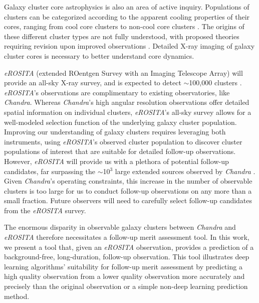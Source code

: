 \documentclass[twocolumn, 11pt]{aastex63}%
\begin{document}
Galaxy cluster core astrophysics is also an area of active inquiry. Populations of clusters can be categorized according to the apparent cooling properties of their cores, ranging from cool core clusters to non-cool core clusters \citep{Jones_Forman_1984}. The origins of these different cluster types are not fully understood, with proposed theories requiring revision upon improved observations \citep[see][ and references therein for reviews]{Fabian_1994, McNamara_Nulsen_2012, Inoue_2022}. Detailed X-ray imaging of galaxy cluster cores is necessary to better understand core dynamics.

\textit{eROSITA} (extended ROentgen Survey with an Imaging Telescope Array) \citep{eROSITA_Sciencebook_2012} will provide an all-sky X-ray survey, and is expected to detect $\sim$100,000 clusters \citep{Pillepich_2018}. \textit{eROSITA}'s observations are complimentary to existing observatories, like \textit{Chandra}. Whereas \textit{Chandra}'s high angular resolution observations offer detailed spatial information on individual clusters, \textit{eROSITA}'s all-sky survey allows for a well-modeled selection function of the underlying galaxy cluster population. Improving our understanding of galaxy clusters requires leveraging both instruments, using \textit{eROSITA}'s observed cluster population to discover cluster populations of interest that are suitable for detailed follow-up observations. However, \textit{eROSITA} will provide us with a plethora of potential follow-up candidates, far surpassing the $\sim$10$^{3}$ large extended sources observed by \textit{Chandra} \citep[the Chandra Source Catalog release 2;][]{Chandra_dr2_A,Chandra_dr2_B}. Given \textit{Chandra}'s operating constraints, this increase in the number of observable clusters is too large for us to conduct follow-up observations on any more than a small fraction. Future observers will need to carefully select follow-up candidates from the \textit{eROSITA} survey. 

The enormous disparity in observable galaxy clusters between \textit{Chandra} and \textit{eROSITA} therefore necessitates a follow-up merit assessment tool. In this work, we present a tool that, given an \textit{eROSITA} observation, provides a prediction of a background-free, long-duration, follow-up observation. This tool illustrates deep learning algorithms' suitability for follow-up merit assessment by predicting a high quality observation from a lower quality observation more accurately and precisely than the original observation or a simple non-deep learning prediction method. 
\end{document}
